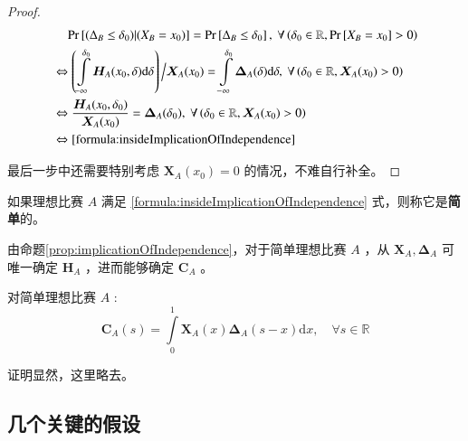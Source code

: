             \begin{proof}
                \begin{align*}
                    &\phantom{\Leftrightarrow\ }\mathrm{Pr}\left[(\Delta_B\leq\delta_0)|(X_B=x_0)\right]=\mathrm{Pr}\left[\Delta_B\leq\delta_0\right],\ \forall \left(\delta_0\in\mathbb{R},\mathrm{Pr}\left[X_B=x_0\right]>0\right) \\
                    &\Leftrightarrow \left(\displaystyle\int\limits_{-\infty}^{\delta_0} \bm{H}_A(x_0,\delta)\mathrm{d}\delta\right)\Big/{\bm{X}_A(x_0)}=\int\limits_{-\infty}^{\delta_0} \bm{\Delta}_A(\delta)\mathrm{d}\delta,\ \forall \left(\delta_0\in\mathbb{R},\bm{X}_A(x_0)>0\right)\\
                    &\Leftrightarrow \frac{\bm{H}_A(x_0,\delta_0)}{\bm{X}_A(x_0)}=\bm{\Delta}_A(\delta_0),\ \forall \left(\delta_0\in\mathbb{R},\bm{X}_A(x_0)>0\right)\\
                    &\Leftrightarrow \eqref{formula:insideImplicationOfIndependence}
                \end{align*}
                
                最后一步中还需要特别考虑 $\bm{X}_A(x_0)=0$ 的情况，不难自行补全。
            \end{proof}

            \begin{definition}[简单理想比赛]
                如果理想比赛 $A$ 满足 \eqref{formula:insideImplicationOfIndependence} 式，则称它是\textbf{简单}的。

                \label{def:simplicityOfContest}
            \end{definition}

            由命题\ref{prop:implicationOfIndependence}，对于简单理想比赛 $A$ ，从 $\bm{X}_A,\bm{\Delta}_A$ 可唯一确定 $\bm{H}_A$ ，进而能够确定 $\bm{C}_A$ 。

            \begin{proposition}[简单理想比赛的分数分布函数]
                对简单理想比赛 $A$ :
                $$
                \bm{C}_A(s)=\int\limits_{0}^1 \bm{X}_A(x)\bm{\Delta}_A(s-x) \mathrm{d}x,\quad\forall s\in\mathbb{R}
                $$

                \label{prop:scoreDistributionInSimpleContest}
            \end{proposition}

            证明显然，这里略去。

    \subsection{几个关键的假设}\label{sec:keyAssumptions}

